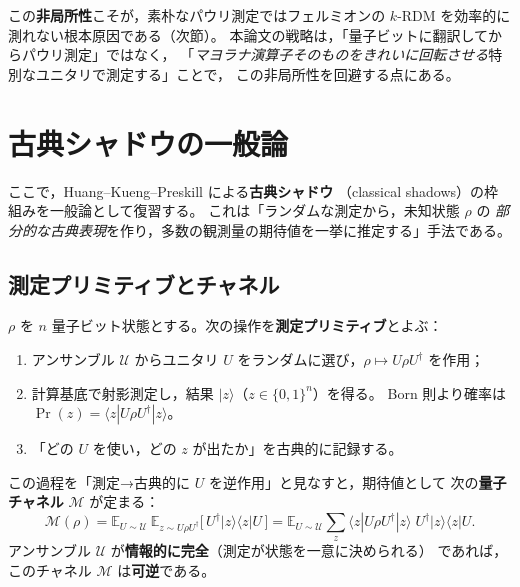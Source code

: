 \documentclass[11pt,a4paper]{ltjsarticle}
\newcommand{\bra}[1]{\langle #1|}
\newcommand{\ket}[1]{|#1\rangle}
\newcommand{\ketbra}[2]{|#1\rangle\!\langle #2|}
\newcommand{\E}{\mathbb{E}}
\newcommand{\Uc}{\mathcal{U}}
\newcommand{\Mc}{\mathcal{M}}
\theoremstyle{definition}
\theoremstyle{plain}
\begin{document}
\begin{ideabox}
この\textbf{非局所性}こそが，素朴なパウリ測定ではフェルミオンの
$k$-RDM を効率的に測れない根本原因である（次節）。
本論文の戦略は，「量子ビットに翻訳してからパウリ測定」ではなく，
「\emph{マヨラナ演算子そのものをきれいに回転させる}特別なユニタリで測定する」ことで，
この非局所性を回避する点にある。
\end{ideabox}

\section{古典シャドウの一般論}\label{sec:cs}

ここで，Huang--Kueng--Preskill による\textbf{古典シャドウ}
（classical shadows）の枠組みを一般論として復習する。
これは「ランダムな測定から，未知状態 $\rho$ の
\emph{部分的な古典表現}を作り，多数の観測量の期待値を一挙に推定する」手法である。

\subsection{測定プリミティブとチャネル}
$\rho$ を $n$ 量子ビット状態とする。次の操作を\textbf{測定プリミティブ}とよぶ：
\begin{enumerate}
  \item アンサンブル $\Uc$ からユニタリ $U$ をランダムに選び，$\rho\mapsto U\rho U^\dagger$ を作用；
  \item 計算基底で射影測定し，結果 $\ket z$（$z\in\{0,1\}^n$）を得る。
        Born 則より確率は $\Pr(z)=\bra z U\rho U^\dagger\ket z$。
  \item 「どの $U$ を使い，どの $z$ が出たか」を古典的に記録する。
\end{enumerate}
この過程を「測定→古典的に $U$ を逆作用」と見なすと，期待値として
次の\textbf{量子チャネル} $\Mc$ が定まる：
\begin{equation}
  \Mc(\rho)=\E_{U\sim\Uc}\ \E_{z\sim U\rho U^\dagger}
     \bigl[\,U^\dagger\ketbra{z}{z}U\,\bigr]
   =\E_{U\sim\Uc}\sum_{z}\bra z U\rho U^\dagger\ket z\;U^\dagger\ketbra{z}{z}U .
  \label{eq:channel}
\end{equation}
アンサンブル $\Uc$ が\textbf{情報的に完全}（測定が状態を一意に決められる）
であれば，このチャネル $\Mc$ は\textbf{可逆}である。
\end{document}
